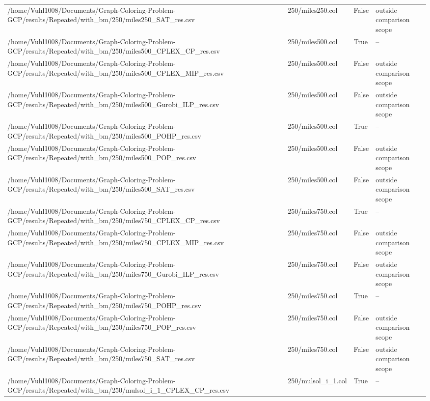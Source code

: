 \begin{table}[htbp]
\begin{tabular}{llll}
/home/Vuhl1008/Documents/Graph-Coloring-Problem-GCP/results/Repeated/with\_bm/250/miles250\_SAT\_res.csv & 250/miles250.col & False & outside comparison scope \\
/home/Vuhl1008/Documents/Graph-Coloring-Problem-GCP/results/Repeated/with\_bm/250/miles500\_CPLEX\_CP\_res.csv & 250/miles500.col & True & -- \\
/home/Vuhl1008/Documents/Graph-Coloring-Problem-GCP/results/Repeated/with\_bm/250/miles500\_CPLEX\_MIP\_res.csv & 250/miles500.col & False & outside comparison scope \\
/home/Vuhl1008/Documents/Graph-Coloring-Problem-GCP/results/Repeated/with\_bm/250/miles500\_Gurobi\_ILP\_res.csv & 250/miles500.col & False & outside comparison scope \\
/home/Vuhl1008/Documents/Graph-Coloring-Problem-GCP/results/Repeated/with\_bm/250/miles500\_POHP\_res.csv & 250/miles500.col & True & -- \\
/home/Vuhl1008/Documents/Graph-Coloring-Problem-GCP/results/Repeated/with\_bm/250/miles500\_POP\_res.csv & 250/miles500.col & False & outside comparison scope \\
/home/Vuhl1008/Documents/Graph-Coloring-Problem-GCP/results/Repeated/with\_bm/250/miles500\_SAT\_res.csv & 250/miles500.col & False & outside comparison scope \\
/home/Vuhl1008/Documents/Graph-Coloring-Problem-GCP/results/Repeated/with\_bm/250/miles750\_CPLEX\_CP\_res.csv & 250/miles750.col & True & -- \\
/home/Vuhl1008/Documents/Graph-Coloring-Problem-GCP/results/Repeated/with\_bm/250/miles750\_CPLEX\_MIP\_res.csv & 250/miles750.col & False & outside comparison scope \\
/home/Vuhl1008/Documents/Graph-Coloring-Problem-GCP/results/Repeated/with\_bm/250/miles750\_Gurobi\_ILP\_res.csv & 250/miles750.col & False & outside comparison scope \\
/home/Vuhl1008/Documents/Graph-Coloring-Problem-GCP/results/Repeated/with\_bm/250/miles750\_POHP\_res.csv & 250/miles750.col & True & -- \\
/home/Vuhl1008/Documents/Graph-Coloring-Problem-GCP/results/Repeated/with\_bm/250/miles750\_POP\_res.csv & 250/miles750.col & False & outside comparison scope \\
/home/Vuhl1008/Documents/Graph-Coloring-Problem-GCP/results/Repeated/with\_bm/250/miles750\_SAT\_res.csv & 250/miles750.col & False & outside comparison scope \\
/home/Vuhl1008/Documents/Graph-Coloring-Problem-GCP/results/Repeated/with\_bm/250/mulsol\_i\_1\_CPLEX\_CP\_res.csv & 250/mulsol\_i\_1.col & True & -- \\

\end{tabular}
\end{table}
